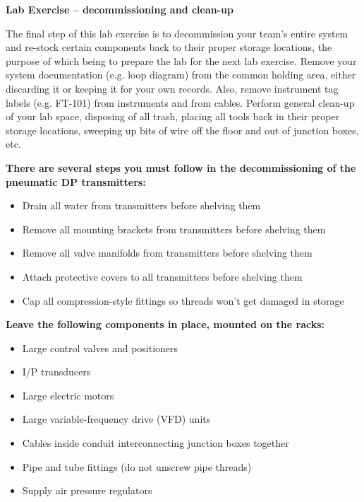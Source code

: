 \vfil \eject

\noindent
{\bf Lab Exercise -- decommissioning and clean-up}

\vskip 5pt

The final step of this lab exercise is to decommission your team's entire system and re-stock certain components back to their proper storage locations, the purpose of which being to prepare the lab for the next lab exercise.  Remove your system documentation (e.g. loop diagram) from the common holding area, either discarding it or keeping it for your own records.  Also, remove instrument tag labels (e.g. FT-101) from instruments and from cables.  Perform general clean-up of your lab space, disposing of all trash, placing all tools back in their proper storage locations, sweeping up bits of wire off the floor and out of junction boxes, etc.

\vskip 10pt

\noindent
{\bf There are several steps you must follow in the decommissioning of the pneumatic DP transmitters:}

\begin{itemize}
\item{} Drain all water from transmitters before shelving them
\item{} Remove all mounting brackets from transmitters before shelving them
\item{} Remove all valve manifolds from transmitters before shelving them
\item{} Attach protective covers to all transmitters before shelving them
\item{} Cap all compression-style fittings so threads won't get damaged in storage
\end{itemize}


\vskip 10pt

\indent
{\bf Leave the following components in place, mounted on the racks:}

\begin{itemize}
\item{} Large control valves and positioners
\item{} I/P transducers
\item{} Large electric motors
\item{} Large variable-frequency drive (VFD) units
\item{} Cables inside conduit interconnecting junction boxes together
\item{} Pipe and tube fittings (do not unscrew pipe threads)
\item{} Supply air pressure regulators
\end{itemize}


